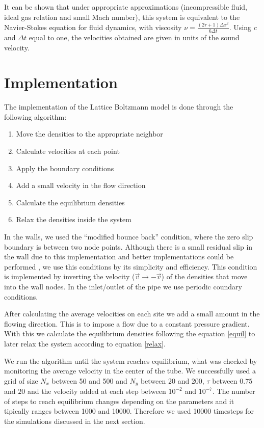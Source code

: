 \documentclass[aps,prl,reprint,groupedaddress]{revtex4-1}
\begin{document}
It can be shown \cite{ICCPBook} that under appropriate approximations (incompressible fluid, ideal gas relation and small Mach number), this system is equivalent to the Navier-Stokes equation for fluid dynamics, with viscosity $\nu = \frac{(2\tau + 1) \Delta x^2}{6 \Delta t}$. Using $c$ and $\Delta t$ equal to one, the velocities obtained are given in units of the sound velocity.

\section{Implementation}

The implementation of the Lattice Boltzmann model is done through the following algorithm:

\begin{enumerate}
\item Move the densities to the appropriate neighbor
\item Calculate velocities at each point
\item Apply the boundary conditions
\item Add a small velocity in the flow direction
\item Calculate the equilibrium densities
\item Relax the densities inside the system
\end{enumerate}

In the walls, we used the ``modified bounce back'' condition, where the zero slip boundary is between two node points. Although there is a small residual slip in the wall due to this implementation and better implementations could be performed \cite{He1997a}, we use this conditions by its simplicity and efficiency. This condition is implemented by inverting the velocity ($\vec{v} \to -\vec{v}$) of the densities that move into the wall nodes. In the inlet/outlet of the pipe we use periodic coundary conditions.

After calculating the average velocities on each site we add a small amount in the flowing direction. This is to impose a flow due to a constant pressure gradient. With this we calculate the equilibrium densities following the equation \ref{equil} to later relax the system according to equation \ref{relax}.

We run the algorithm until the system reaches equilibrium, what was checked by monitoring the average velocity in the center of the tube. We successfully used a grid of size $N_x$ between 50 and 500 and $N_y$ between 20 and 200, $\tau$ between $0.75$ and $20$ and the velocity added at each step between $10^{-2}$ and $10^{-7}$. The number of steps to reach equilibrium changes depending on the parameters and it tipically ranges between 1000 and 10000. Therefore we used 10000 timesteps for the simulations discussed in the next section. 
\end{document}
